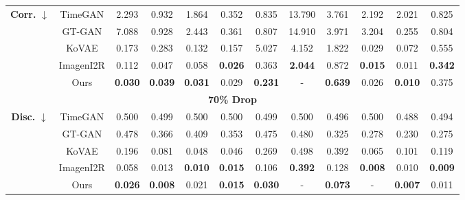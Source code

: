 \documentclass{article}
\theoremstyle{plain}
\theoremstyle{definition}
\theoremstyle{remark}
\begin{document}
\begin{table}[!t]
{\begin{tabular}{cc|cccccccccc}
    \multirow{5}{*}{\textbf{Corr.} $\downarrow$}
      & TimeGAN
         & 2.293
         & 0.932
         & 1.864
         & 0.352
         & 0.835
         & 13.790
         & 3.761
         & 2.192
         & 2.021
         & 0.825 \\
      & GT-GAN
         & 7.088
         & 0.928
         & 2.443
         & 0.361
         & 0.807
         & 14.910
         & 3.971
         & 3.204
         & 0.255
         & 0.804 \\
      & KoVAE
         & 0.173
         & 0.283
         & 0.132
         & 0.157
         & 5.027
         & 4.152
         & 1.822
         & 0.029
         & 0.072
         & 0.555 \\
      & ImagenI2R
         & 0.112
         & 0.047
         & 0.058
         & \textbf{0.026}
         & 0.363
         & \textbf{2.044}
         & 0.872
         & \textbf{0.015}
         & 0.011
         & \textbf{0.342} \\
    & Ours
       & \textbf{0.030} & \textbf{0.039} & \textbf{0.031} & 0.029 & \textbf{0.231} & - & \textbf{0.639} & 0.026 & \textbf{0.010} & 0.375 \\
    \midrule

    \multicolumn{12}{c}{\textbf{70\% Drop}} \\[3pt]
    \midrule
    \multirow{5}{*}{\textbf{Disc.} $\downarrow$}
      & TimeGAN
         & 0.500
         & 0.499
         & 0.500
         & 0.500
         & 0.499
         & 0.500
         & 0.496
         & 0.500
         & 0.488
         & 0.494 \\
      & GT-GAN
         & 0.478
         & 0.366
         & 0.409
         & 0.353
         & 0.475
         & 0.480
         & 0.325
         & 0.278
         & 0.230
         & 0.275 \\
      & KoVAE
         & 0.196
         & 0.081
         & 0.048
         & 0.046
         & 0.269
         & 0.498
         & 0.392
         & 0.065
         & 0.101
         & 0.119 \\
      & ImagenI2R
         & 0.058
         & 0.013
         & \textbf{0.010}
         & \textbf{0.015}
         & 0.106
         & \textbf{0.392}
         & 0.128
         & \textbf{0.008}
         & 0.010
         & \textbf{0.009} \\
    & Ours
       & \textbf{0.026} & \textbf{0.008} & 0.021 & \textbf{0.015} & \textbf{0.030} & - & \textbf{0.073} & - & \textbf{0.007} & 0.011 \\
    \midrule


\end{tabular}}
\end{table}
\end{document}
